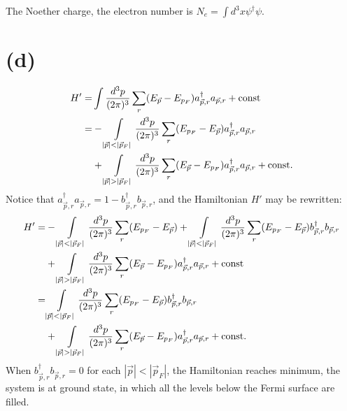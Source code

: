 \documentclass[12pt]{article}
\begin{document}
The Noether charge, the electron number is $N_e=\int d^3x\psi^\dagger\psi$.

\section*{(d)}

\begin{equation*}
    \begin{split}
        H'=&\int\frac{d^3p}{(2\pi)^3}\sum_r(E_{\vec{p}}-E_{p_F})
        a^\dagger_{\vec{p},r}a_{\vec{p},r}+{\rm const}\\
        =&-\int\limits_{|\vec{p}|<|\vec{p}_F|}\frac{d^3p}{(2\pi)^3}\sum_r
        (E_{p_F}-E_{\vec{p}})a^\dagger_{\vec{p},r}a_{\vec{p},r}\\
        &+\int\limits_{|\vec{p}|>|\vec{p}_F|}\frac{d^3p}{(2\pi)^3}\sum_r
        (E_{\vec{p}}-E_{p_F})a^\dagger_{\vec{p},r}a_{\vec{p},r}+{\rm const}.
    \end{split}
\end{equation*}
Notice that $a^\dagger_{\vec{p},r}a_{\vec{p},r}=1-b^\dagger_{\vec{p},r}b_{\vec{p},r}$, 
and the Hamiltonian $H'$ may be rewritten:
\begin{equation*}
    \begin{split}
        H'=&-\int\limits_{|\vec{p}|<|\vec{p}_F|}\frac{d^3p}{(2\pi)^3}
        \sum_r(E_{p_F}-E_{\vec{p}})+
        \int\limits_{|\vec{p}|<|\vec{p}_F|}\frac{d^3p}{(2\pi)^3}\sum_r
        (E_{p_F}-E_{\vec{p}})b^\dagger_{\vec{p},r}b_{\vec{p},r}\\
        &+\int\limits_{|\vec{p}|>|\vec{p}_F|}\frac{d^3p}{(2\pi)^3}\sum_r
        (E_{\vec{p}}-E_{p_F})a^\dagger_{\vec{p},r}a_{\vec{p},r}+{\rm const}\\
        =&\int\limits_{|\vec{p}|<|\vec{p}_F|}\frac{d^3p}{(2\pi)^3}\sum_r
        (E_{p_F}-E_{\vec{p}})b^\dagger_{\vec{p},r}b_{\vec{p},r}\\
        &+\int\limits_{|\vec{p}|>|\vec{p}_F|}\frac{d^3p}{(2\pi)^3}\sum_r
        (E_{\vec{p}}-E_{p_F})a^\dagger_{\vec{p},r}a_{\vec{p},r}+{\rm const}.
    \end{split}
\end{equation*}
When $b^\dagger_{\vec{p},r}b_{\vec{p},r}=0$ for each $|\vec{p}|<|\vec{p}_F|$, 
the Hamiltonian reaches minimum, the system is at ground state, in which all 
the levels below the Fermi surface are filled.
\end{document}
